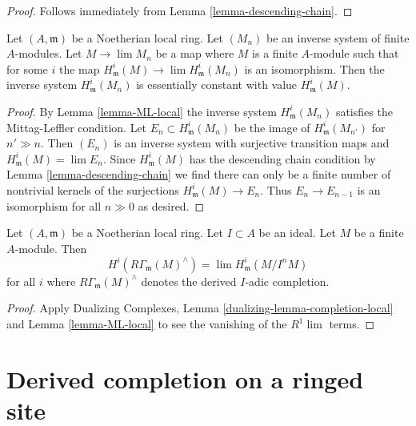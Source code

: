 \begin{proof}
Follows immediately from Lemma \ref{lemma-descending-chain}.
\end{proof}

\begin{lemma}
\label{lemma-terrific}
Let $(A, \mathfrak m)$ be a Noetherian local ring.
Let $(M_n)$ be an inverse system of finite $A$-modules.
Let $M \to \lim M_n$ be a map where $M$ is a finite $A$-module
such that for some $i$ the map
$H^i_\mathfrak m(M) \to \lim H^i_\mathfrak m(M_n)$
is an isomorphism.
Then the inverse system $H^i_\mathfrak m(M_n)$
is essentially constant with value $H^i_\mathfrak m(M)$.
\end{lemma}

\begin{proof}
By Lemma \ref{lemma-ML-local} the inverse system $H^i_\mathfrak m(M_n)$
satisfies the Mittag-Leffler condition. Let $E_n \subset H^i_\mathfrak m(M_n)$
be the image of $H^i_\mathfrak m(M_{n'})$ for $n' \gg n$.
Then $(E_n)$ is an inverse system with surjective transition maps
and $H^i_\mathfrak m(M) = \lim E_n$. Since $H^i_\mathfrak m(M)$
has the descending chain condition by
Lemma \ref{lemma-descending-chain}
we find there can only be a finite number of nontrivial
kernels of the surjections $H^i_\mathfrak m(M) \to E_n$.
Thus $E_n \to E_{n - 1}$ is an isomorphism for all $n \gg 0$
as desired.
\end{proof}

\begin{lemma}
\label{lemma-local-cohomology-derived-completion}
Let $(A, \mathfrak m)$ be a Noetherian local ring.
Let $I \subset A$ be an ideal. Let $M$ be a finite $A$-module.
Then
$$
H^i(R\Gamma_\mathfrak m(M)^\wedge) = \lim H^i_\mathfrak m(M/I^nM)
$$
for all $i$ where $R\Gamma_\mathfrak m(M)^\wedge$ denotes
the derived $I$-adic completion.
\end{lemma}

\begin{proof}
Apply Dualizing Complexes, Lemma \ref{dualizing-lemma-completion-local}
and Lemma \ref{lemma-ML-local} to see the vanishing of the $R^1\lim$ terms.
\end{proof}








\section{Derived completion on a ringed site}
\label{section-derived-completion}

